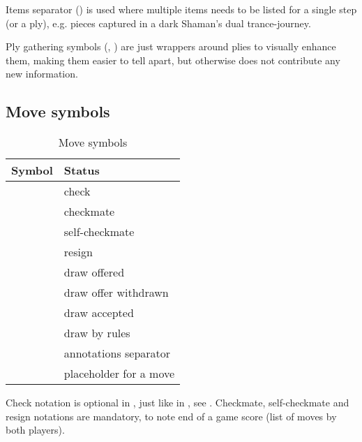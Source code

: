 Items separator (\alg{,}) is used where multiple items needs to be listed for a single
step (or a ply), e.g. pieces captured in a dark Shaman's dual trance-journey.

Ply gathering symbols (\alg{[}, \alg{]}) are just wrappers around plies to visually
enhance them, making them easier to tell apart, but otherwise does not contribute any
new information.

\clearpage %

\subsection*{Move symbols}
\label{sec:Appendix/Summary/Move symbols}

\begin{table}[!h]
\centering
\begin{tabular}{ rl }
\toprule %
\textbf{Symbol}      & \textbf{Status}                \\
\midrule %
\alg{+}              & check                          \\
\alg{\#}             & checkmate                      \\
\alg{\#}             & self-checkmate                 \\
\alg{\#\#}           & resign                         \\
\cmidrule{1-2} %
\alg{(=)}            & draw offered                   \\
\alg{(-)}            & draw offer withdrawn           \\
\alg{(==)}           & draw accepted                  \\
\alg{(===)}          & draw by rules                  \\
\cmidrule{1-2} %
\alg{\_}             & annotations separator          \\
\alg{...}            & placeholder for a move         \\
\bottomrule %
\end{tabular}
\caption{Move symbols}
\label{tbl:Appendix/Summary/Move symbols}
\end{table}

Check notation is optional in , just like in , see
. Checkmate, self-checkmate and resign notations are mandatory,
to note end of a game score (list of moves by both players).

